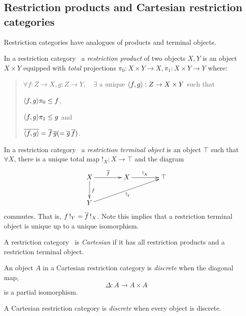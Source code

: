 \subsection{Restriction products and Cartesian restriction categories} %
\label{sub:restriction_products_and_cartesian_restriction_categories}


Restriction categories have analogues of products and terminal objects.


\begin{definition}
In a restriction category \X\, a \emph{restriction product}  of two objects $X, Y$ is an object
$X\times Y$ equipped with \emph{total} projections $\pi_0:X\times Y\to X,
\pi_1:X\times Y\to Y $ where:
\begin{quote}
$\forall f:Z\to X, g: Z\to Y,\quad \exists$ a unique
$\langle f,g\rangle:Z \to X\times Y$ such that
\bi
\item $\langle f,g\rangle \pi_0 \le f$,
\item $\langle f,g\rangle \pi_1 \le g$ and
\item $\overline{\langle f,g\rangle} = \overline{f}\, \overline{g} ( = \overline{g}\, \overline{f})$.
\ei
\end{quote}
\end{definition}

\begin{definition}
In a restriction category \X\, a \emph{restriction terminal object}
is an object $\top$ such that $\forall X$, there is a
unique total map $!_X : X \to \top$ and the diagram
\[
\xymatrix @C=40pt @R=25pt{
X \ar[r]^{\restr{f}} \ar[d]^{f} & X \ar[r]^{!_X}  &\top  \\
Y \ar[urr]_{!_Y}}
\]
commutes. That is,  $f\, !_Y = \overline{f}\, !_X$. Note this implies
that a restriction terminal object is unique up to a unique isomorphism.
\end{definition}

\begin{definition}
A restriction category \X\ is \emph{Cartesian} if it has all restriction products
and a restriction terminal object.
\end{definition}

\begin{definition}
An object $A$ in a Cartesian restriction category is \emph{discrete}
when the diagonal map,
\[\Delta:A \to A \times A\]
is a partial isomorphism.

A Cartesian restriction category is \emph{discrete} when every object is
discrete.
\end{definition}

